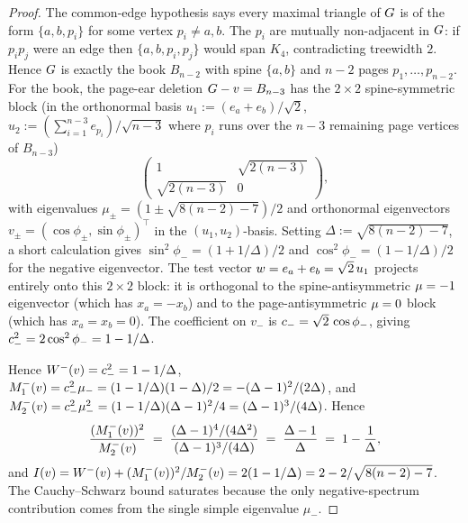 \begin{proof}
The common-edge hypothesis says every maximal triangle of $G$ is
of the form $\{a, b, p_{i}\}$ for some vertex $p_{i} \ne a, b$. The
$p_{i}$ are mutually non-adjacent in $G$: if $p_{i} p_{j}$ were an
edge then $\{a, b, p_{i}, p_{j}\}$ would span $K_{4}$, contradicting
treewidth $2$. Hence $G$ is exactly the book $B_{n - 2}$ with
spine $\{a, b\}$ and $n - 2$ pages $p_{1}, \ldots, p_{n-2}$.
For the book, the page-ear deletion $G - v = B_{n-3}$ has the
$2 \times 2$ spine-symmetric block (in the orthonormal basis
$u_{1} := (e_{a} + e_{b})/\sqrt{2}$, $u_{2} := (\sum_{i=1}^{n-3} e_{p_{i}})/\sqrt{n-3}$
where $p_{i}$ runs over the $n - 3$ remaining page vertices of $B_{n-3}$)
\[
\begin{pmatrix} 1 & \sqrt{2(n-3)} \\ \sqrt{2(n-3)} & 0 \end{pmatrix},
\]
with eigenvalues $\mu_{\pm} = (1 \pm \sqrt{8(n-2) - 7})/2$ and
orthonormal eigenvectors $v_{\pm} = (\cos\phi_{\pm}, \sin\phi_{\pm})^{\top}$
in the $(u_{1}, u_{2})$-basis. Setting
$\Delta := \sqrt{8(n - 2) - 7}$, a short calculation gives
$\sin^{2}\phi_{-} = (1 + 1/\Delta)/2$ and $\cos^{2}\phi_{-} = (1 - 1/\Delta)/2$
for the negative eigenvector. The test vector $w = e_{a} + e_{b} =
\sqrt{2}\, u_{1}$ projects entirely onto this $2 \times 2$ block: it is
orthogonal to the spine-antisymmetric $\mu = -1$ eigenvector (which
has $x_{a} = -x_{b}$) and to the page-antisymmetric $\mu = 0$ block
(which has $x_{a} = x_{b} = 0$). The coefficient on $v_{-}$ is
$c_{-} = \sqrt{2}\, \cos\phi_{-}$, giving
$c_{-}^{2} = 2 \cos^{2}\phi_{-} = 1 - 1/\Delta$.

Hence $W^{-}(v) = c_{-}^{2} = 1 - 1/\Delta$,
$M_{1}^{-}(v) = c_{-}^{2} \mu_{-} = (1 - 1/\Delta)(1 - \Delta)/2 = -(\Delta - 1)^{2}/(2\Delta)$,
and $M_{2}^{-}(v) = c_{-}^{2}\mu_{-}^{2} = (1 - 1/\Delta)(\Delta - 1)^{2}/4 = (\Delta - 1)^{3}/(4\Delta)$.
Hence
\[
\frac{(M_{1}^{-}(v))^{2}}{M_{2}^{-}(v)}
\;=\; \frac{(\Delta - 1)^{4}/(4\Delta^{2})}{(\Delta - 1)^{3}/(4\Delta)}
\;=\; \frac{\Delta - 1}{\Delta} \;=\; 1 - \frac{1}{\Delta},
\]
and $I(v) = W^{-}(v) + (M_{1}^{-}(v))^{2}/M_{2}^{-}(v) = 2(1 - 1/\Delta) = 2 - 2/\sqrt{8(n-2) - 7}$.
The Cauchy--Schwarz bound  saturates because the only
negative-spectrum contribution comes from the single simple eigenvalue
$\mu_{-}$.
\end{proof}

